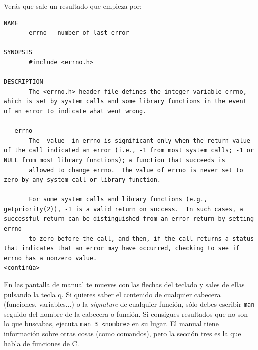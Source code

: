 \documentclass[a4paper]{article}
\begin{document}
Verás que sale un resultado que empieza por:

\noindent
\begin{minipage}[H]{\linewidth}
\mbox{}
\begin{lstlisting}[style=terminalStyle]
NAME
       errno - number of last error

SYNOPSIS
       #include <errno.h>

DESCRIPTION
       The <errno.h> header file defines the integer variable errno, which is set by system calls and some library functions in the event of an error to indicate what went wrong.

   errno
       The  value  in errno is significant only when the return value of the call indicated an error (i.e., -1 from most system calls; -1 or NULL from most library functions); a function that succeeds is
       allowed to change errno.  The value of errno is never set to zero by any system call or library function.

       For some system calls and library functions (e.g., getpriority(2)), -1 is a valid return on success.  In such cases, a successful return can be distinguished from an error return by setting  errno
       to zero before the call, and then, if the call returns a status that indicates that an error may have occurred, checking to see if errno has a nonzero value.
<continúa>
\end{lstlisting}
\end{minipage}

En las pantalla de manual te mueves con las flechas del teclado y sales de ellas
pulsando la tecla q. Si quieres saber el contenido de cualquier cabecera
(funciones, variables...) o la \textit{signature} de cualquier función, sólo
debes escribir \verb!man! seguido del nombre de la cabecera o función. Si
consigues resultados que no son lo que buscabas, ejecuta \verb!man 3 <nombre>!
en su lugar. El manual tiene información sobre otras cosas (como comandos),
pero la sección tres es la que habla de funciones de C.
\end{document}
